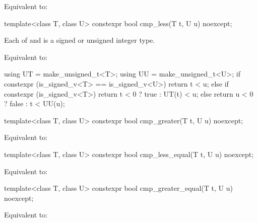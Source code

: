 \begin{itemdescr}
\pnum
\effects
Equivalent to: 
\end{itemdescr}

%
\begin{itemdecl}
template<class T, class U>
  constexpr bool cmp_less(T t, U u) noexcept;
\end{itemdecl}

\begin{itemdescr}
\pnum
\mandates
Each of  and  is
a signed or unsigned integer type.

\pnum
\effects
Equivalent to:
\begin{codeblock}
using UT = make_unsigned_t<T>;
using UU = make_unsigned_t<U>;
if constexpr (is_signed_v<T> == is_signed_v<U>)
  return t < u;
else if constexpr (is_signed_v<T>)
  return t < 0 ? true : UT(t) < u;
else
  return u < 0 ? false : t < UU(u);
\end{codeblock}
\end{itemdescr}

%
\begin{itemdecl}
template<class T, class U>
  constexpr bool cmp_greater(T t, U u) noexcept;
\end{itemdecl}

\begin{itemdescr}
\pnum
\effects
Equivalent to: 
\end{itemdescr}

%
\begin{itemdecl}
template<class T, class U>
  constexpr bool cmp_less_equal(T t, U u) noexcept;
\end{itemdecl}

\begin{itemdescr}
\pnum
\effects
Equivalent to: 
\end{itemdescr}

%
\begin{itemdecl}
template<class T, class U>
  constexpr bool cmp_greater_equal(T t, U u) noexcept;
\end{itemdecl}

\begin{itemdescr}
\pnum
\effects
Equivalent to: 
\end{itemdescr}

